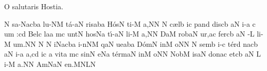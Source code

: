 \beginhymn O salutaris Hostia.

\Internote
\nosolesmescustos
\initiumgregorianum
{}%
\sgn {}{}{}\punctum N\egn
\sgn sa-\pes Na\nonspatium\climacus cba\egn
\sgn lu-\clivis NM\egn
\sgn t{\'a}-\clivis aN\egn
\sgn ris\torculus aba\egn
\spatium
\sgn H{\'o}s\punctum N\egn
\sgn ti-\punctum M\egn
\sgn {}a,\punctum N\augmentum N\egn
\spatium
\divisiominor
\spatium
{}\punctum N\egn
\spatium
\sgn c{\ae}l\punctum b\egn
\sgn {}i{}\punctum c\egn
\spatium
\sgn p{a}n\punctum d\egn
\sgn dis\clivis cb\egn
\spatium
{}\clivis aN\egn
\sgn {}i-\punctum a\egn
\custos c
\lineaproxima
\sgn {}u{m :}\engl{}\punctum c\augmentum d\egn
\spatium
\divisiomaior
\spatium
\sgn B{e}l\punctum c\egn
\sgn la{}\punctum a\egn
\spatium
{}m\punctum c\egn
\sgn {}u{nt}\punctum N\egn
\spatium
\sgn hos\pes Na\egn
\sgn t{\'\i}-\clivis aN\egn
\sgn li-\punctum M\egn
\sgn {}a{,}\punctum N\augmentum N\egn
\spatium
\divisiominor
\spatium
\sgn Da{}\punctum M\egn
\spatium
\sgn r{o}b\clivis aN\egn
\sgn {}u{r,}\pes ac\egn
\spatium
\sgn fer\clivis cb\egn
\spatium
{}\clivis aN\egn
\sgn {}{\'\i}-\punctum L\egn
\sgn li-\punctum M\egn
\sgn {}u{m.}\punctum N\augmentum N\egn
\spatium
\divisiofinalis
\spatium %
\custos N
\lineaproxima
{}\punctum N\egn
\sgn {}i{}\pes Na\nonspatium\climacus cba\egn
\spatium
{}i{-n}\clivis NM\egn
{}q\clivis aN\egn
\sgn ue{}\torculus aba\egn
\spatium
\sgn D{\'o}m\punctum N\egn
\sgn {}in\punctum M\egn
\sgn {}o{}\punctum N\augmentum N\egn
\spatium
\divisiominor
\spatium
{}\punctum N\egn
\spatium
\sgn s{e}m\punctum b\egn
{}i{-}\punctum c\egn
\sgn t{\'e}r\punctum d\egn
\sgn na{}\clivis cb\egn
\spatium
{}\clivis aN\egn
{}i-\punctum a\egn
\sgn {}a{,}\punctum c\augmentum d\egn
\spatium
\divisiomaior
\spatium
{}i{}\engl{}\punctum c\egn
\spatium
\custos a
\lineaproxima
\sgn v{i}t\punctum a\egn
{}m\punctum c\egn
\spatium
\sgn si{n}\punctum N\egn
\sgn {}e{}\pes Na\egn
\spatium
\sgn t{\'e}{rm}\clivis aN\egn
\sgn {}in\punctum M\egn
\sgn {}o{}\punctum N\augmentum N\egn
\spatium
\divisiominor
\spatium
\sgn N{o}b\punctum M\egn
\sgn {}is\clivis aN\egn
\spatium
\sgn d{o}n\pes ac\egn
\sgn {}et\clivis cb\egn
\spatium
{}\clivis aN\egn
\spatium
{}\punctum L\egn
\sgn {}i-\punctum M\egn
\sgn {}a{.}\punctum N\augmentum N\egn
\spatium
\divisiofinalis
\spatium
\sgn {}Am\torculus NaN\egn
\sgn {}e{n.}\pes MN\augmentumduplex LN\egn
\spatium
\Finisgregoriana

